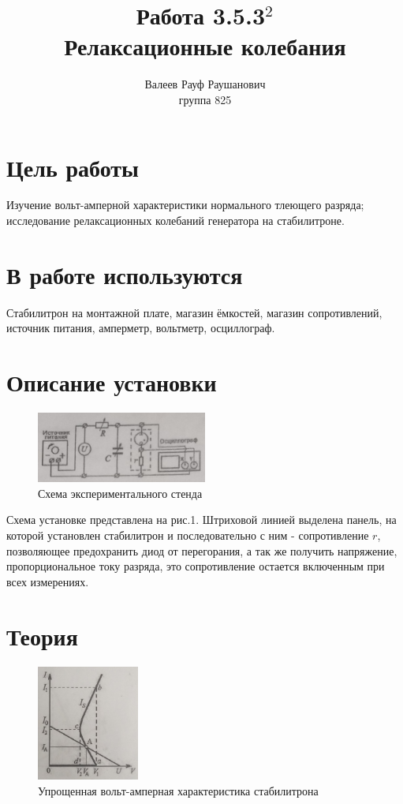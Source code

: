 \documentclass[a4paper, 12pt]{article}%
\author{Валеев Рауф Раушанович \\
группа 825}
\title{\textbf{Работа 3.5.3$^2$\\Релаксационные колебания }}
\begin{document}
\maketitle
\newpage
\section*{Цель работы}
Изучение вольт-амперной характеристики нормального тлеющего разряда; исследование релаксационных колебаний генератора на стабилитроне.
\section*{В работе используются}
Стабилитрон на монтажной плате, магазин ёмкостей, магазин сопротивлений, источник питания, амперметр, вольтметр, осциллограф.
\section*{Описание установки}
\begin{figure}
\includegraphics[width = 0.5\textwidth]{3.png}
\caption{Схема экспериментального стенда}
\end{figure}
Схема установке представлена на рис.1. Штриховой линией выделена панель, на которой установлен стабилитрон и последовательно с ним - сопротивление $r$, позволяющее предохранить диод от перегорания, а так же получить напряжение, пропорциональное току разряда, это сопротивление остается включенным при всех измерениях.

\section*{Теория}
\begin{figure}
\includegraphics[width = 0.3\textwidth]{2.png}
\caption{Упрощенная вольт-амперная характеристика стабилитрона}
\end{figure}
\end{document}

